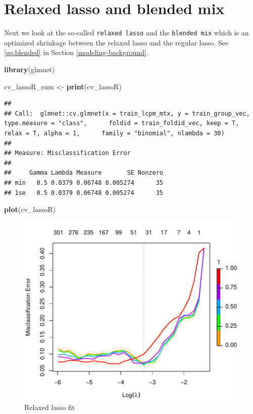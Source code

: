 \documentclass[
]{book}
\newenvironment{Shaded}{\begin{snugshade}}{\end{snugshade}}
\newcommand{\KeywordTok}[1]{\textcolor[rgb]{0.13,0.29,0.53}{\textbf{#1}}}
\newcommand{\NormalTok}[1]{#1}
\newcommand{\StringTok}[1]{\textcolor[rgb]{0.31,0.60,0.02}{#1}}
\begin{document}
\hypertarget{relaxed-lasso-and-blended-mix}{%
\section{Relaxed lasso and blended mix}\label{relaxed-lasso-and-blended-mix}}

Next we look at the so-called \texttt{relaxed\ lasso} and
the \texttt{blended\ mix} which is an optimized shrinkage
between the relaxed lasso and the regular lasso.
See \eqref{eq:blended} in Section \ref{modeling-background}.

\begin{Shaded}
\begin{Highlighting}[]
\KeywordTok{library}\NormalTok{(glmnet)}

\NormalTok{cv\_lassoR\_sum <{-}}\StringTok{ }\KeywordTok{print}\NormalTok{(cv\_lassoR)}
\end{Highlighting}
\end{Shaded}

\begin{verbatim}
## 
## Call:  glmnet::cv.glmnet(x = train_lcpm_mtx, y = train_group_vec, type.measure = "class",      foldid = train_foldid_vec, keep = T, relax = T, alpha = 1,      family = "binomial", nlambda = 30) 
## 
## Measure: Misclassification Error 
## 
##     Gamma Lambda Measure       SE Nonzero
## min   0.5 0.0379 0.06748 0.005274      35
## 1se   0.5 0.0379 0.06748 0.005274      35
\end{verbatim}

\begin{Shaded}
\begin{Highlighting}[]
\KeywordTok{plot}\NormalTok{(cv\_lassoR)}
\end{Highlighting}
\end{Shaded}

\begin{figure}
\centering
\includegraphics{Static/figures/lookLassoR-1.pdf}
\caption{\label{fig:lookLassoR}Relaxed lasso fit}
\end{figure}
\end{document}
